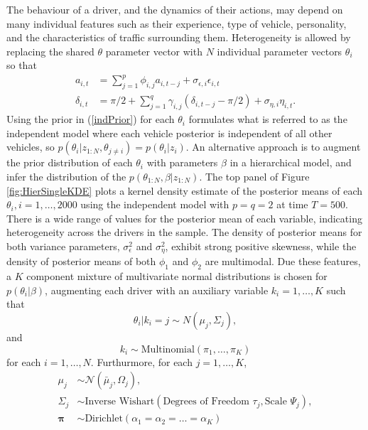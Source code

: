 \documentclass[12pt,a4paper]{article}\usepackage[]{graphicx}\usepackage[]{color}
\begin{document}
The behaviour of a driver, and the dynamics of their actions, may depend on many individual features such as their experience, type of vehicle, personality, and the characteristics of traffic surrounding them. Heterogeneity is allowed by replacing the shared $\theta$ parameter vector with $N$ individual parameter vectors $\theta_i$ so that
\begin{align}
a_{i, t} &= \sum_{j = 1}^p \phi_{i, j} a_{i, t-j} + \sigma_{\epsilon, i} \epsilon_{i, t} \label{aAR2} \\
\delta_{i, t} &= \pi/2 + \sum_{j = 1}^q \gamma_{i, j} (\delta_{i, t-j} - \pi/2) + \sigma_{\eta, i} \eta_{i, t}. \label{dAR2}
\end{align}
Using the prior in (\ref{indPrior}) for each $\theta_i$ formulates what is referred to as the independent model where each vehicle posterior is independent of all other vehicles, so $p(\theta_i | z_{1:N}, \theta_{j \neq i}) = p(\theta_i | z_i)$. An alternative approach is to augment the prior distribution of each $\theta_i$ with parameters $\beta$ in a hierarchical model, and infer the distribution of the $p(\theta_{1:N}, \beta | z_{1:N})$. The top panel of Figure \ref{fig:HierSingleKDE} plots a kernel density estimate of the posterior means of each $\theta_i, i = 1, \dots, 2000$ using the independent model with $p = q = 2$ at time $T = 500$. There is a wide range of values for the posterior mean of each variable, indicating heterogeneity across the drivers in the sample. The density of posterior means for both variance parameters, $\sigma^2_{\epsilon}$ and $\sigma^2_{\eta}$, exhibit strong positive skewness, while the density of posterior means of both $\phi_1$ and $\phi_2$ are multimodal. Due these features, a $K$ component mixture of multivariate normal distributions is chosen for $p(\theta_i | \beta)$, augmenting each driver with an auxiliary variable $k_i = 1, \dots, K$ such that 
\begin{equation}
\label{mixPrior}
\theta_i | k_i = j \sim N(\mu_j, \Sigma_j),
\end{equation}
and
\begin{equation}
k_i \sim \mbox{Multinomial}\left(\pi_1, \dots, \pi_{K}\right)
\end{equation}
for each $i = 1, \dots, N$. Furthurmore, for each $j = 1, \dots, K$,  
\begin{align}
\mu_j &\sim \mathcal{N}\left(\bar{\mu}_j, \Omega_j\right), \\
\Sigma_j &\sim \mbox{Inverse Wishart}\left(\mbox{Degrees of Freedom } \tau_j, \mbox{Scale } \Psi_j\right), \\
\boldsymbol{\pi} &\sim \mbox{Dirichlet}\left(\alpha_1 = \alpha_2 = \dots = \alpha_K\right)
\end{align}
\end{document}
